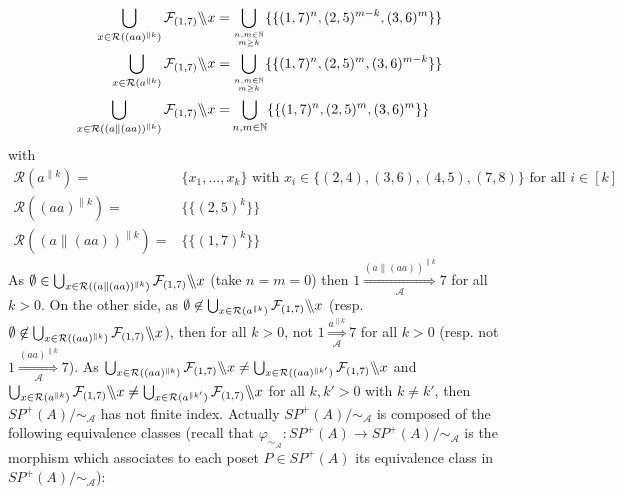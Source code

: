 \documentclass{CSML}
\newcommand{\quotientparallel}[2]{\ensuremath{#1\backslash\kern-3pt\backslash#2}}
\begin{document}
\begin{exa}
  \begin{align*}
    \bigcup_{x\in \mathcal{R}((aa)^{\parallel k})}\quotientparallel{\mathcal{F}_{(1,7)}}{x}=&\bigcup_{n,m\in\mathbb{N}\atop m\geq k}\{\{(1,7)^n,(2,5)^{m-k},(3,6)^m\}\}\\
    \bigcup_{x\in \mathcal{R}(a^{\parallel k})}\quotientparallel{\mathcal{F}_{(1,7)}}{x}=&\bigcup_{n,m\in\mathbb{N}\atop m\geq k}\{\{(1,7)^n,(2,5)^{m},(3,6)^{m-k}\}\}\\
    \bigcup_{x\in \mathcal{R}((a\parallel (aa))^{\parallel k})}\quotientparallel{\mathcal{F}_{(1,7)}}{x}=&\bigcup_{n,m\in\mathbb{N}}\{\{(1,7)^{n},(2,5)^{m},(3,6)^{m}\}\}\\
  \end{align*}
with
  \begin{align*}
    \mathcal{R}(a^{\parallel k})=&\{x_1,\dots,x_k\}\text{ with } x_i\in\{(2,4),(3,6),(4,5),(7,8)\}\text{ for all }i\in[k]\\
    \mathcal{R}((aa)^{\parallel k})=&\{\{(2,5)^k\}\}\\
    \mathcal{R}((a\parallel (aa))^{\parallel k})=&\{\{(1,7)^k\}\}
  \end{align*}
  As $\emptyset\in \bigcup_{x\in \mathcal{R}((a\parallel (aa))^{\parallel k})}\quotientparallel{\mathcal{F}_{(1,7)}}{x}$ (take $n=m=0$) then $1 \mathop{\Longrightarrow}\limits_{\mathcal{A}}^{(a\parallel (aa))^{\parallel k}} 7$ for all $k>0$.
  On the other side, as $\emptyset\not\in\bigcup_{x\in \mathcal{R}(a^{\parallel k})}\quotientparallel{\mathcal{F}_{(1,7)}}{x}$ (resp. $\emptyset\not\in\bigcup_{x\in \mathcal{R}((aa)^{\parallel k})}\quotientparallel{\mathcal{F}_{(1,7)}}{x}$), then for all $k>0$, not $1 \mathop{\Longrightarrow}\limits_{\mathcal{A}}^{a^{\parallel k}} 7$ for all $k>0$ (resp. not $1 \mathop{\Longrightarrow}\limits_{\mathcal{A}}^{(aa)^{\parallel k}} 7$).
  As $\bigcup_{x\in \mathcal{R}((aa)^{\parallel k})}\quotientparallel{\mathcal{F}_{(1,7)}}{x}\not=\bigcup_{x\in \mathcal{R}((aa)^{\parallel k'})}\quotientparallel{\mathcal{F}_{(1,7)}}{x}$ and $\bigcup_{x\in \mathcal{R}(a^{\parallel k})}\quotientparallel{\mathcal{F}_{(1,7)}}{x}\not=\bigcup_{x\in \mathcal{R}(a^{\parallel k'})}\quotientparallel{\mathcal{F}_{(1,7)}}{x}$ for all $k,k'>0$ with $k\not=k'$, then $SP^+(A)/\mathord{\sim_\mathcal{A}}$ has not finite index. 
  Actually $SP^+(A)/\mathord{\sim_\mathcal{A}}$ is composed of the following equivalence classes (recall that $\varphi_{\sim_{\mathcal{A}}}:SP^+(A)\to SP^+(A)/\mathord\sim_\mathcal{A}$ is the morphism which associates to each poset $P\in SP^+(A)$ its equivalence class in $SP^+(A)/\mathord\sim_\mathcal{A}$):

\end{exa}
\end{document}
